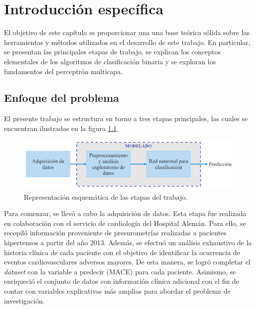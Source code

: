 \chapter{Introducción específica} %

\label{Chapter2}

El objetivo de este capítulo es proporcionar una una base teórica sólida sobre las herramientas y 
métodos utilizados en el desarrollo de este trabajo. En particular,  se presentan las principales 
etapas de trabajo, se explican los conceptos elementales de los algoritmos de clasificación binaria 
y se exploran los fundamentos del perceptrón multicapa.

\section{Enfoque del problema}
\label{sec:Enfoque del problema}

El presente trabajo se estructura en torno a tres etapas principales, las cuales se 
encuentran ilustradas en la figura \ref{fig:Etapas de trabajo}.


\begin{figure}[ht]
	\centering
	\includegraphics[width=\textwidth]{./Figures/Etapas de trabajo.jpg}
	\caption{Representación esquemática de las etapas del trabajo.}\label{fig:Etapas de trabajo}
\end{figure}

Para comenzar, se llevó a cabo la adquisición de datos. 
Esta etapa fue realizada en colaboración con el servicio de cardiología del Hospital Alemán. 
Para ello, se recopiló información proveniente de presurometrías realizadas a pacientes 
hipertensos a partir del año 2013. Además, se efectuó un análisis exhaustivo de la historia 
clínica de cada paciente con el objetivo de identificar la ocurrencia de eventos cardiovasculares 
adversos mayores. De esta manera, se logró completar el \textit{dataset} con la variable a predecir (MACE) 
para cada paciente. Asimismo, se enriqueció el conjunto de datos con información clínica adicional 
con el fin de contar con variables explicativas más amplias para abordar el problema de investigación.

